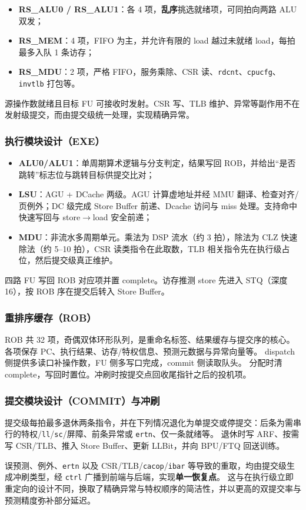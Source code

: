 \begin{itemize}
  \item \textbf{RS\_ALU0 / RS\_ALU1}：各 4 项，\textbf{乱序}挑选就绪项，可同拍向两路 ALU 双发；
  \item \textbf{RS\_MEM}：4 项，FIFO 为主，并允许有限的 load 越过未就绪 load，每拍最多入队 1 条访存；
  \item \textbf{RS\_MDU}：2 项，严格 FIFO，服务乘除、CSR 读、\texttt{rdcnt}、\texttt{cpucfg}、\texttt{invtlb} 打包等。
\end{itemize}

源操作数就绪且目标 FU 可接收时发射。CSR 写、TLB 维护、异常等副作用不在发射级提交，而由提交级统一处理，实现精确异常。

\subsubsection{执行模块设计（EXE）}

\begin{itemize}
  \item \textbf{ALU0/ALU1}：单周期算术逻辑与分支判定，结果写回 ROB，并给出“是否跳转”标志位与跳转目标供提交比对；
  \item \textbf{LSU}：AGU + DCache 两级。AGU 计算虚地址并经 MMU 翻译、检查对齐/页例外；DC 级完成 Store Buffer 前递、Dcache 访问与 miss 处理。支持命中快速写回与 store$\rightarrow$load 安全前递；
  \item \textbf{MDU}：非流水多周期单元。乘法为 DSP 流水（约 3 拍），除法为 CLZ 快速除法（约 5--10 拍），CSR 读类指令在此取数，TLB 相关指令先在执行级占位，然后提交级真正维护。
\end{itemize}

四路 FU 写回 ROB 对应项并置 complete。访存推测 store 先进入 STQ（深度 16），按 ROB 序在提交后转入 Store Buffer。

\subsubsection{重排序缓存（ROB）}

ROB 共 32 项，奇偶双体环形队列，是重命名标签、结果缓存与提交序的核心。
各项保存 PC、执行结果、访存/特权信息、预测元数据与异常向量等。
dispatch 侧提供多读口补操作数，FU 侧多写口完成，commit 侧读取队头。
分配时清complete，写回时置位。冲刷时按提交点回收尾指针之后的投机项。

\subsubsection{提交模块设计（COMMIT）与冲刷}

提交级每拍最多退休两条指令，并在下列情况退化为单提交或停提交：后条为需串行的特权/\texttt{ll}/\texttt{sc}/屏障、前条异常或 \texttt{ertn}、仅一条就绪等。
退休时写 ARF、按需写 CSR/TLB、推入 Store Buffer、更新 LLBit，并向 BPU/FTQ 回送训练。

误预测、例外、\texttt{ertn} 以及 CSR/TLB/\texttt{cacop}/\texttt{ibar} 等导致的重取，均由提交级生成冲刷类型，经 \texttt{ctrl} 广播到前端与后端，实现\textbf{单一恢复点}。
这与在执行级立即重定向的设计不同，换取了精确异常与特权顺序的简洁性，并以更高的双提交率与预测精度弥补部分延迟。
